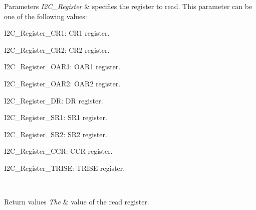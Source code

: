 \begin{DoxyParams}{Parameters}
{\em I2\+C\+\_\+\+Register} & specifies the register to read. This parameter can be one of the following values\+: \begin{DoxyItemize}
\item I2\+C\+\_\+\+Register\+\_\+\+C\+R1\+: C\+R1 register. \item I2\+C\+\_\+\+Register\+\_\+\+C\+R2\+: C\+R2 register. \item I2\+C\+\_\+\+Register\+\_\+\+O\+A\+R1\+: O\+A\+R1 register. \item I2\+C\+\_\+\+Register\+\_\+\+O\+A\+R2\+: O\+A\+R2 register. \item I2\+C\+\_\+\+Register\+\_\+\+DR\+: DR register. \item I2\+C\+\_\+\+Register\+\_\+\+S\+R1\+: S\+R1 register. \item I2\+C\+\_\+\+Register\+\_\+\+S\+R2\+: S\+R2 register. \item I2\+C\+\_\+\+Register\+\_\+\+C\+CR\+: C\+CR register. \item I2\+C\+\_\+\+Register\+\_\+\+T\+R\+I\+SE\+: T\+R\+I\+SE register. \end{DoxyItemize}
\\
\hline
\end{DoxyParams}

\begin{DoxyRetVals}{Return values}
{\em The} & value of the read register. \\
\hline
\end{DoxyRetVals}
